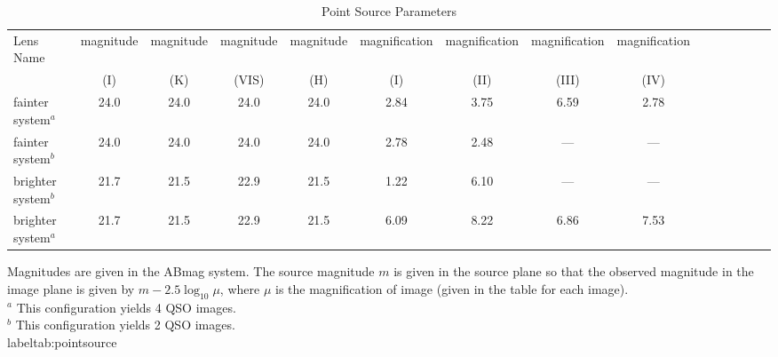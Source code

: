 \documentclass[a4paper,11pt]{article}
\begin{document}
\begin{table}\footnotesize
\begin{center}
\caption{Point Source Parameters}
\begin{tabular}{lcccccccccccccc|}
\hline \hline
Lens Name & magnitude & magnitude & magnitude & magnitude & magnification & magnification & magnification & magnification\\
&  (I) &  (K) &  (VIS) & (H) & (I) & (II) & (III) & (IV) \\
\hline
fainter system$^a$   &24.0  &   24.0 &  24.0 &  24.0 &  2.84 &  3.75 & 6.59 & 2.78  \\
fainter system$^b$   &24.0  &  24.0  &  24.0 &  24.0 &  2.78 &  2.48 &  ---   &  ---\\
brighter system$^b$ &21.7  &  21.5 &  22.9  & 21.5  & 1.22  & 6.10  & ---   &  ---\\
brighter system$^a$ &21.7  &  21.5 & 22.9  &  21.5  & 6.09  & 8.22 & 6.86  & 7.53\\
\hline
\hline
\end{tabular}
\begin{tablenotes}
\item 
Magnitudes are given in the ABmag system. The source magnitude $m$ is given in the source plane so that the observed magnitude in the image plane is given by $m-2.5\log_{10} \mu$, where $\mu$ is the magnification of image (given in the table for each image). \\
$^a$ This configuration yields 4 QSO images. \\
$^b$ This configuration yields 2 QSO images. \\
label{tab:pointsource}
\end{tablenotes}
\end{center}
\end{table}
\end{document}
